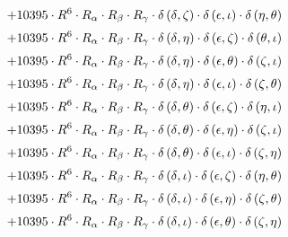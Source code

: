 \begin{subequations}
\begin{gather}
 \\[0.2em] \notag 		 + 10395 \cdot R^{6} \cdot R_{\alpha{}} \cdot R_{\beta{}} \cdot R_{\gamma{}} \cdot \delta{}\left(\delta{}, \zeta{}\right) \cdot \delta{}\left(\epsilon{}, \iota{}\right) \cdot \delta{}\left(\eta{}, \theta{}\right) 
 \\[0.2em] \notag 		 + 10395 \cdot R^{6} \cdot R_{\alpha{}} \cdot R_{\beta{}} \cdot R_{\gamma{}} \cdot \delta{}\left(\delta{}, \eta{}\right) \cdot \delta{}\left(\epsilon{}, \zeta{}\right) \cdot \delta{}\left(\theta{}, \iota{}\right) 
 \\[0.2em] \notag 		 + 10395 \cdot R^{6} \cdot R_{\alpha{}} \cdot R_{\beta{}} \cdot R_{\gamma{}} \cdot \delta{}\left(\delta{}, \eta{}\right) \cdot \delta{}\left(\epsilon{}, \theta{}\right) \cdot \delta{}\left(\zeta{}, \iota{}\right) 
 \\[0.2em] \notag 		 + 10395 \cdot R^{6} \cdot R_{\alpha{}} \cdot R_{\beta{}} \cdot R_{\gamma{}} \cdot \delta{}\left(\delta{}, \eta{}\right) \cdot \delta{}\left(\epsilon{}, \iota{}\right) \cdot \delta{}\left(\zeta{}, \theta{}\right) 
 \\[0.2em] \notag 		 + 10395 \cdot R^{6} \cdot R_{\alpha{}} \cdot R_{\beta{}} \cdot R_{\gamma{}} \cdot \delta{}\left(\delta{}, \theta{}\right) \cdot \delta{}\left(\epsilon{}, \zeta{}\right) \cdot \delta{}\left(\eta{}, \iota{}\right) 
 \\[0.2em] \notag 		 + 10395 \cdot R^{6} \cdot R_{\alpha{}} \cdot R_{\beta{}} \cdot R_{\gamma{}} \cdot \delta{}\left(\delta{}, \theta{}\right) \cdot \delta{}\left(\epsilon{}, \eta{}\right) \cdot \delta{}\left(\zeta{}, \iota{}\right) 
 \\[0.2em] \notag 		 + 10395 \cdot R^{6} \cdot R_{\alpha{}} \cdot R_{\beta{}} \cdot R_{\gamma{}} \cdot \delta{}\left(\delta{}, \theta{}\right) \cdot \delta{}\left(\epsilon{}, \iota{}\right) \cdot \delta{}\left(\zeta{}, \eta{}\right) 
 \\[0.2em] \notag 		 + 10395 \cdot R^{6} \cdot R_{\alpha{}} \cdot R_{\beta{}} \cdot R_{\gamma{}} \cdot \delta{}\left(\delta{}, \iota{}\right) \cdot \delta{}\left(\epsilon{}, \zeta{}\right) \cdot \delta{}\left(\eta{}, \theta{}\right) 
 \\[0.2em] \notag 		 + 10395 \cdot R^{6} \cdot R_{\alpha{}} \cdot R_{\beta{}} \cdot R_{\gamma{}} \cdot \delta{}\left(\delta{}, \iota{}\right) \cdot \delta{}\left(\epsilon{}, \eta{}\right) \cdot \delta{}\left(\zeta{}, \theta{}\right) 
 \\[0.2em] \notag 		 + 10395 \cdot R^{6} \cdot R_{\alpha{}} \cdot R_{\beta{}} \cdot R_{\gamma{}} \cdot \delta{}\left(\delta{}, \iota{}\right) \cdot \delta{}\left(\epsilon{}, \theta{}\right) \cdot \delta{}\left(\zeta{}, \eta{}\right) 

\end{gather}
\end{subequations}
